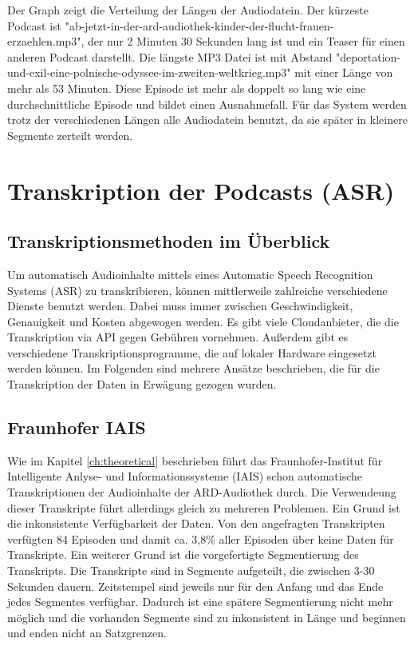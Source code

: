 Der Graph zeigt die Verteilung der Längen der Audiodatein.
Der kürzeste Podcast ist "ab-jetzt-in-der-ard-audiothek-kinder-der-flucht-frauen-erzaehlen.mp3", der nur 2 Minuten 30 Sekunden lang ist und ein Teaser für einen anderen Podcast darstellt.
Die längste MP3 Datei ist mit Abstand "deportation-und-exil-eine-polnische-odyssee-im-zweiten-weltkrieg.mp3" mit einer Länge von mehr als 53 Minuten.
Diese Episode ist mehr als doppelt so lang wie eine durchschnittliche Episode und bildet einen Ausnahmefall.
Für das System werden trotz der verschiedenen Längen alle Audiodatein benutzt, da sie später in kleinere Segmente zerteilt werden.



\section{Transkription der Podcasts (ASR)}

\subsection{Transkriptionsmethoden im Überblick}

Um automatisch Audioinhalte mittels eines Automatic Speech Recognition Systems (ASR) zu transkribieren, können mittlerweile zahlreiche verschiedene Dienste benutzt werden.
Dabei muss immer zwischen Geschwindigkeit, Genauigkeit und Kosten abgewogen werden.
Es gibt viele Cloudanbieter, die die Transkription via API gegen Gebühren vornehmen.
Außerdem gibt es verschiedene Transkriptionsprogramme, die auf lokaler Hardware eingesetzt werden können.
Im Folgenden sind mehrere Ansätze beschrieben, die für die Transkription der Daten in Erwägung gezogen wurden.


\subsection{Fraunhofer IAIS}

Wie im Kapitel \autoref*{ch:theoretical} beschrieben führt das Fraunhofer-Institut für Intelligente Anlyse- und Informationssysteme (IAIS) schon automatische Transkriptionen der Audioinhalte der ARD-Audiothek durch.
Die Verwendeung dieser Transkripte führt allerdings gleich zu mehreren Problemen.
Ein Grund ist die inkonsistente Verfügbarkeit der Daten.
Von den angefragten Transkripten verfügten 84 Episoden und damit ca. 3,8\% aller Episoden über keine Daten für Transkripte.
Ein weiterer Grund ist die vorgefertigte Segmentierung des Transkripts.
Die Transkripte sind in Segmente aufgeteilt, die zwischen 3-30 Sekunden dauern.
Zeitstempel sind jeweils nur für den Anfang und das Ende jedes Segmentes verfügbar.
Dadurch ist eine spätere Segmentierung nicht mehr möglich und die vorhanden Segmente sind zu inkonsistent in Länge und beginnen und enden nicht an Satzgrenzen.




